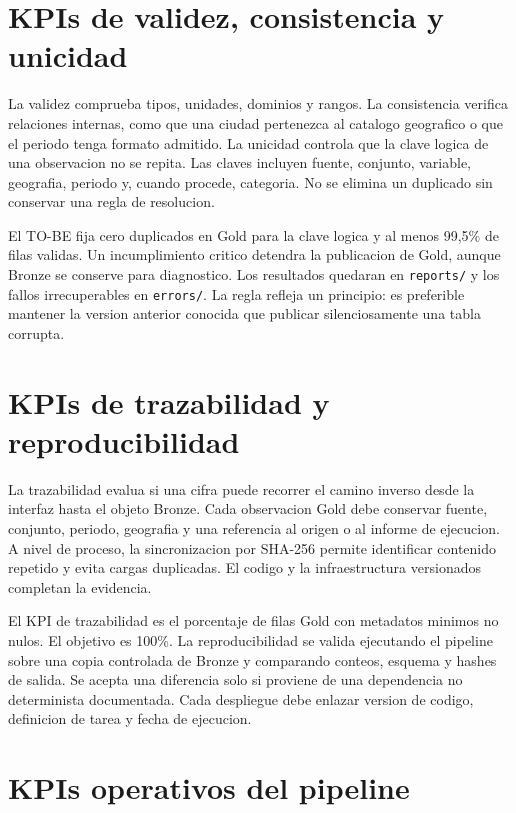 \section{KPIs de validez, consistencia y unicidad}

La validez comprueba tipos, unidades, dominios y rangos. La consistencia verifica relaciones internas, como que una ciudad pertenezca al catalogo geografico o que el periodo tenga formato admitido. La unicidad controla que la clave logica de una observacion no se repita. Las claves incluyen fuente, conjunto, variable, geografia, periodo y, cuando procede, categoria. No se elimina un duplicado sin conservar una regla de resolucion.

El TO-BE fija cero duplicados en Gold para la clave logica y al menos 99,5\% de filas validas. Un incumplimiento critico detendra la publicacion de Gold, aunque Bronze se conserve para diagnostico. Los resultados quedaran en \texttt{reports/} y los fallos irrecuperables en \texttt{errors/}. La regla refleja un principio: es preferible mantener la version anterior conocida que publicar silenciosamente una tabla corrupta.

\section{KPIs de trazabilidad y reproducibilidad}

La trazabilidad evalua si una cifra puede recorrer el camino inverso desde la interfaz hasta el objeto Bronze. Cada observacion Gold debe conservar fuente, conjunto, periodo, geografia y una referencia al origen o al informe de ejecucion. A nivel de proceso, la sincronizacion por SHA-256 permite identificar contenido repetido y evita cargas duplicadas. El codigo y la infraestructura versionados completan la evidencia.

El KPI de trazabilidad es el porcentaje de filas Gold con metadatos minimos no nulos. El objetivo es 100\%. La reproducibilidad se valida ejecutando el pipeline sobre una copia controlada de Bronze y comparando conteos, esquema y hashes de salida. Se acepta una diferencia solo si proviene de una dependencia no determinista documentada. Cada despliegue debe enlazar version de codigo, definicion de tarea y fecha de ejecucion.

\section{KPIs operativos del pipeline}

